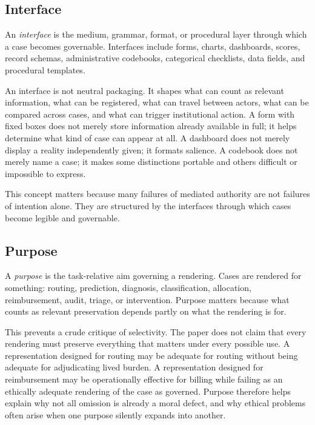 \documentclass[11pt]{article}
\renewcommand{\emph}[1]{\textit{#1}}
\begin{document}
\subsection{Interface}

An \emph{interface} is the medium, grammar, format, or procedural layer through which a case becomes governable. Interfaces include forms, charts, dashboards, scores, record schemas, administrative codebooks, categorical checklists, data fields, and procedural templates. \cite{BowkerStar1999SortingThingsOut,Swanson2026ConstrainedDescribability}

An interface is not neutral packaging. It shapes what can count as relevant information, what can be registered, what can travel between actors, what can be compared across cases, and what can trigger institutional action. A form with fixed boxes does not merely store information already available in full; it helps determine what kind of case can appear at all. A dashboard does not merely display a reality independently given; it formats salience. A codebook does not merely name a case; it makes some distinctions portable and others difficult or impossible to express.

This concept matters because many failures of mediated authority are not failures of intention alone. They are structured by the interfaces through which cases become legible and governable.

\subsection{Purpose}

A \emph{purpose} is the task-relative aim governing a rendering. Cases are rendered for something: routing, prediction, diagnosis, classification, allocation, reimbursement, audit, triage, or intervention. Purpose matters because what counts as relevant preservation depends partly on what the rendering is for. \cite{Swanson2026ConstrainedDescribability,Swanson2026ConstraintConditionDisclosure}

This prevents a crude critique of selectivity. The paper does not claim that every rendering must preserve everything that matters under every possible use. A representation designed for routing may be adequate for routing without being adequate for adjudicating lived burden. A representation designed for reimbursement may be operationally effective for billing while failing as an ethically adequate rendering of the case as governed. Purpose therefore helps explain why not all omission is already a moral defect, and why ethical problems often arise when one purpose silently expands into another.
\end{document}
